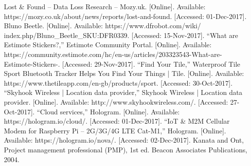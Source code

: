 \documentclass[12pt,a4paper]{article}
\begin{document}
    \begin{thebibliography}{20}
       Lost \& Found – Data Loss Research – Mozy.uk. [Online]. Available: https://mozy.co.uk/about/news/reports/lost-and-found. [Accessed: 01-Dec-2017].      
       Bluno Beetle. [Online]. Available: https://www.dfrobot.com/wiki/\\index.php/Bluno\_Beetle\_SKU:DFR0339. [Accessed: 15-Nov-2017].
       “What are Estimote Stickers?,” Estimote Community Portal. [Online]. Available: https://community.estimote.com/hc/en-us/articles/203323543-What-are-Estimote-Stickers-. [Accessed: 29-Nov-2017].
       “Find Your Tile,” Waterproof Tile Sport Bluetooth Tracker Helps You Find Your Things | Tile. [Online]. Available: https://www.thetileapp.com/en-gb/products/sport. [Accessed: 30-Oct-2017].
       “Skyhook Wireless | Location data provider,” Skyhook Wireless | Location data provider. [Online]. Available: http://www.skyhookwireless.com/. [Accessed: 27-Oct-2017].
       “Cloud services,” Hologram. [Online]. Available: https://hologram.io/cloud/. [Accessed: 01-Dec-2017].
       “IoT \& M2M Cellular Modem for Raspberry Pi – 2G/3G/4G LTE Cat-M1,” Hologram. [Online]. Available: https://hologram.io/nova/. [Accessed: 02-Dec-2017].
       Kanata and Ont, Project management professional (PMP), 1st ed. Beacon Associates Publications, 2004.
      
    \end{thebibliography}
    
\end{document}
